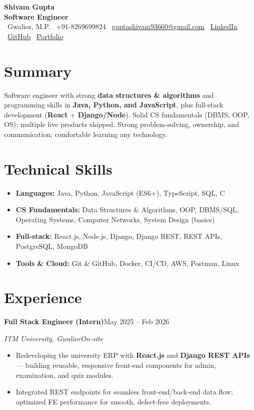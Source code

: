 \documentclass[a4paper,10pt]{article}
\newcommand{\entry}[4]{%
  \vspace{3pt}%
  \textbf{#1}\hfill #2\par
  \vspace{1pt}%
  \textit{#3}\hfill \textit{#4}\par
  \vspace{2pt}%
}
\begin{document}
\begin{center}
  {\Huge \textbf{Shivam Gupta}}\\[4pt]
  {\color{accent}\textbf{Software Engineer}}\\[5pt]
  {\small
  \faMapMarker~Gwalior, M.P. \quad
  \faPhone~+91-8269699824 \quad
  \faEnvelope~\href{mailto:guptashivam93660@gmail.com}{guptashivam93660@gmail.com} \quad
  \faLinkedin~\href{https://www.linkedin.com/in/ur-990q}{LinkedIn} \quad
  \faGithub~\href{https://github.com/Shivam990q}{GitHub} \quad
  \faGlobe~\href{https://shivam-portfolio-a1s4.onrender.com}{Portfolio}}
\end{center}

\section{Summary}
Software engineer with strong \textbf{data structures \& algorithms} and programming skills in
\textbf{Java, Python, and JavaScript}, plus full-stack development (\textbf{React} + \textbf{Django/Node}).
Solid CS fundamentals (DBMS, OOP, OS); multiple live products shipped. Strong problem-solving,
ownership, and communication; comfortable learning any technology.

\section{Technical Skills}
\begin{itemize}[label={}, leftmargin=0pt, topsep=2pt, itemsep=2pt]
  \item \textbf{Languages:} Java, Python, JavaScript (ES6+), TypeScript, SQL, C
  \item \textbf{CS Fundamentals:} Data Structures \& Algorithms, OOP, DBMS/SQL, Operating Systems,
        Computer Networks, System Design (basics)
  \item \textbf{Full-stack:} React.js, Node.js, Django, Django REST, REST APIs, PostgreSQL, MongoDB
  \item \textbf{Tools \& Cloud:} Git \& GitHub, Docker, CI/CD, AWS, Postman, Linux
\end{itemize}

\section{Experience}
\entry{Full Stack Engineer (Intern)}{May 2025 -- Feb 2026}{ITM University, Gwalior}{On-site}
\begin{itemize}
  \item Redeveloping the university ERP with \textbf{React.js} and \textbf{Django REST APIs} ---
        building reusable, responsive front-end components for admin, examination, and quiz modules.
  \item Integrated REST endpoints for seamless front-end/back-end data flow; optimized FE
        performance for smooth, defect-free deployments.
\end{itemize}
\end{document}
